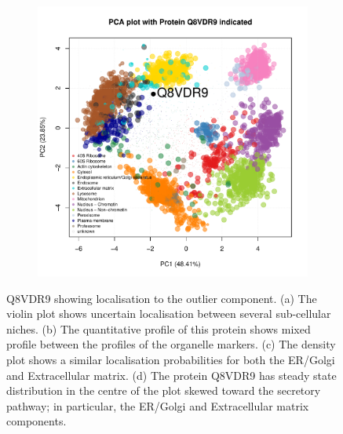 \documentclass[12pt,english]{article}\usepackage[]{graphicx}\usepackage[]{color}
\makeatletter
\def\maxwidth{ %
  \ifdim\Gin@nat@width>\linewidth
    \linewidth
  \else
    \Gin@nat@width
  \fi
}
\newenvironment{knitrout}{}{} %
\makeatother
\begin{document}
\begin{figure}[h]
\begin{subfigure}[t]{0.5\textwidth}
\begin{knitrout}
{}



\end{knitrout}
    \caption{}
  \end{subfigure}%
  \begin{subfigure}[t]{0.5\textwidth}
    \centering
\begin{knitrout}
\color{fgcolor}

{\centering \includegraphics[width=\maxwidth]{figure/unnamed-chunk-23-1} 

}



\end{knitrout}
    \caption{}
  \end{subfigure}

  \caption{Q8VDR9 showing localisation to the outlier component.  (a)
    The violin plot shows uncertain localisation between several
    sub-cellular niches. (b) The quantitative profile of this protein
    shows mixed profile between the profiles of the organelle
    markers. (c) The density plot shows a similar localisation
    probabilities for both the ER/Golgi and Extracellular matrix. (d)
    The protein Q8VDR9 has steady state distribution in the centre of
    the plot skewed toward the secretory pathway; in particular, the
    ER/Golgi and Extracellular matrix components.}
  \label{fig:Q8VDR9}
\end{figure}
\end{document}
